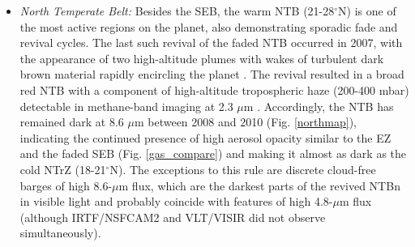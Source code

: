 \documentclass[final,5p,times,twocolumn,authoryear]{elsarticle}
\newcommand{\degree}{\ensuremath{^\circ}}
\begin{document}
\begin{itemize}
\item \textit{North Temperate Belt: }  Besides the SEB, the warm NTB (21-28\degree N) is one of the most active regions on the planet, also demonstrating sporadic fade and revival cycles. The last such revival of the faded NTB occurred in 2007, with the appearance of two high-altitude plumes with wakes of turbulent dark brown material rapidly encircling the planet \citep{08sanchez, 07rogers}.  The revival resulted in a broad red NTB with a component of high-altitude tropospheric haze (200-400 mbar) detectable in methane-band imaging at 2.3 $\mu$m \citep{08sanchez}.  Accordingly, the NTB has remained dark at 8.6 $\mu$m between 2008 and 2010 (Fig. \ref{northmap}), indicating the continued presence of high aerosol opacity similar to the EZ and the faded SEB (Fig. \ref{gas_compare}) and making it almost as dark as the cold NTrZ (18-21$^\circ$N).   The exceptions to this rule are discrete cloud-free barges of high 8.6-$\mu$m flux, which are the darkest parts of the revived NTBn in visible light and probably coincide with features of high 4.8-$\mu$m flux (although IRTF/NSFCAM2 and VLT/VISIR did not observe simultaneously).
\end{itemize}
\end{document}
